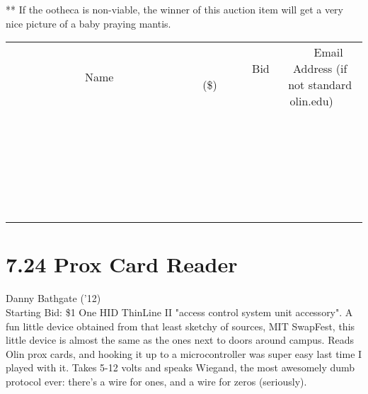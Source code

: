 \documentclass[11pt]{article}
\begin{document}
** If the ootheca is non-viable, the winner of this auction item will get a very nice picture of a baby praying mantis.
\\[6ex]
\begin{tabular}{c c c}
~~~~~~~~~~~~~Name~~~~~~~~~~~~~ & ~~~~~~~~~Bid (\$)~~~~~~~~~  & ~~~Email Address (if not standard olin.edu)~~~\\
 & & \\
\hline
 & & \\
\hline
 & & \\
\hline
 & & \\
\hline
 & & \\
\hline
 & & \\
\hline
 & & \\
\hline
 & & \\
\hline
 & & \\
\hline
 & & \\
\hline
 & & \\
\hline
 & & \\
\hline
 & & \\
\hline
 & & \\
\hline
 & & \\
\hline
 & & \\
\hline
 & & \\
\hline
 & & \\
\hline
 & & \\
\hline
 & & \\
\hline
 & & \\
\hline
 & & \\
\hline
 & & \\
\hline
 & & \\
\hline
 & & \\
\hline
 & & \\
\hline
\end{tabular}
\newpage
\section*{7.24 Prox Card Reader}
Danny Bathgate ('12)
\\
Starting Bid: \$1
\newline
One HID ThinLine II "access control system unit accessory". A fun little device obtained from that least sketchy of sources, MIT SwapFest, this little device is almost the same as the ones next to doors around campus. Reads Olin prox cards, and hooking it up to a microcontroller was super easy last time I played with it. Takes 5-12 volts and speaks Wiegand, the most awesomely dumb protocol ever: there's a wire for ones, and a wire for zeros (seriously).
\end{document}
